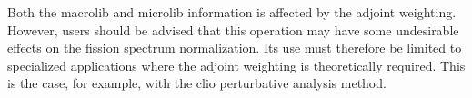 Both the macrolib and microlib information is affected by the adjoint weighting. However, users should be advised that this operation may have some
undesirable effects on the fission spectrum normalization. Its use must therefore be limited to specialized applications where the adjoint weighting
is theoretically required. This is the case, for example, with the {\sc clio} perturbative analysis method.\cite{clio}

\eject
